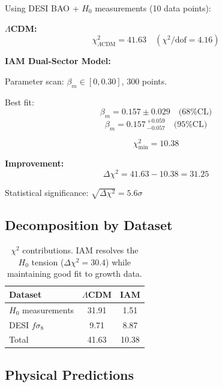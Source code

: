 \documentclass[twocolumn,superscriptaddress,prl,amsmath,amssymb]{revtex4-2}
\begin{document}
Using DESI BAO + $H_0$ measurements (10 data points):

\textbf{$\Lambda$CDM:}
\begin{equation}
\chi^2_{\Lambda\text{CDM}} = 41.63 \quad (\chi^2/\text{dof} = 4.16)
\end{equation}

\textbf{IAM Dual-Sector Model:}

Parameter scan: $\beta_m \in [0, 0.30]$, 300 points.

Best fit:
\begin{equation}
\beta_m = 0.157 \pm 0.029 \quad \text{(68\% CL)}
\end{equation}
\begin{equation}
\beta_m = 0.157\,^{+0.059}_{-0.057} \quad \text{(95\% CL)}
\end{equation}

\begin{equation}
\chi^2_{\min} = 10.38
\end{equation}

\textbf{Improvement:}
\begin{equation}
\Delta\chi^2 = 41.63 - 10.38 = 31.25
\end{equation}

Statistical significance: $\sqrt{\Delta\chi^2} = 5.6\sigma$

\subsection{Decomposition by Dataset}

\begin{table}[h]
\centering
\begin{tabular}{lcc}
\hline\hline
Dataset & $\Lambda$CDM & IAM \\
\hline
$H_0$ measurements & 31.91 & 1.51 \\
DESI $f\sigma_8$ & 9.71 & 8.87 \\
\hline
Total & 41.63 & 10.38 \\
\hline\hline
\end{tabular}
\caption{$\chi^2$ contributions. IAM resolves the $H_0$ tension ($\Delta\chi^2 = 30.4$) while maintaining good fit to growth data.}
\label{tab:chi2_breakdown}
\end{table}

\subsection{Physical Predictions}
\end{document}
